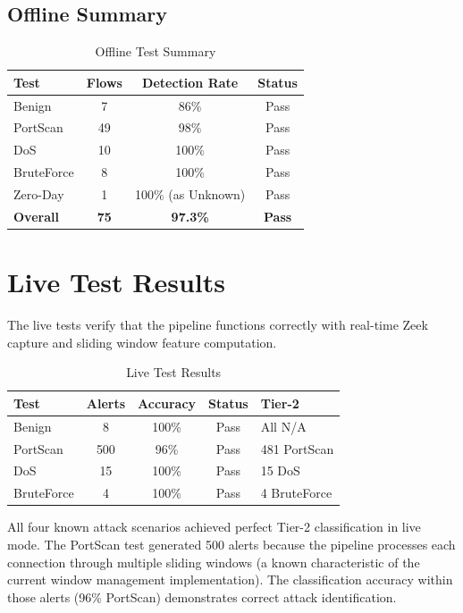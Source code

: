 \documentclass[12pt,a4paper,twoside]{report}
\begin{document}
\subsection{Offline Summary}

\begin{table}[H]
\centering
\caption{Offline Test Summary}
\begin{tabularx}{\textwidth}{lccc}
\toprule
\textbf{Test} & \textbf{Flows} & \textbf{Detection Rate} & \textbf{Status} \\
\midrule
Benign & 7 & 86\% & Pass \\
PortScan & 49 & 98\% & Pass \\
DoS & 10 & 100\% & Pass \\
BruteForce & 8 & 100\% & Pass \\
Zero-Day & 1 & 100\% (as Unknown) & Pass \\
\midrule
\textbf{Overall} & \textbf{75} & \textbf{97.3\%} & \textbf{Pass} \\
\bottomrule
\end{tabularx}
\end{table}

\section{Live Test Results}

The live tests verify that the pipeline functions correctly with real-time Zeek capture and sliding window feature computation.

\begin{table}[H]
\centering
\caption{Live Test Results}
\begin{tabularx}{\textwidth}{lcccX}
\toprule
\textbf{Test} & \textbf{Alerts} & \textbf{Accuracy} & \textbf{Status} & \textbf{Tier-2} \\
\midrule
Benign & 8 & 100\% & Pass & All N/A \\
PortScan & 500 & 96\% & Pass & 481 PortScan \\
DoS & 15 & 100\% & Pass & 15 DoS \\
BruteForce & 4 & 100\% & Pass & 4 BruteForce \\
\bottomrule
\end{tabularx}
\end{table}

All four known attack scenarios achieved perfect Tier-2 classification in live mode. The PortScan test generated 500 alerts because the pipeline processes each connection through multiple sliding windows (a known characteristic of the current window management implementation). The classification accuracy within those alerts (96\% PortScan) demonstrates correct attack identification.
\end{document}
